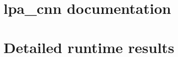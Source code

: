 \documentclass[12pt]{report}
\begin{document}
\newpage
{}
\listoffigures

\newpage
{}
\listofmyequations

\clearpage

\setcounter{page}{1}

\begin{spacing}{1.15}
	
	
	
		
	
\end{spacing}
\newpage
\thispagestyle{empty}
\null

\begin{appendices}
\chapter{lpa\_cnn documentation}

\chapter{Detailed runtime results}

\end{appendices}


\end{document}
